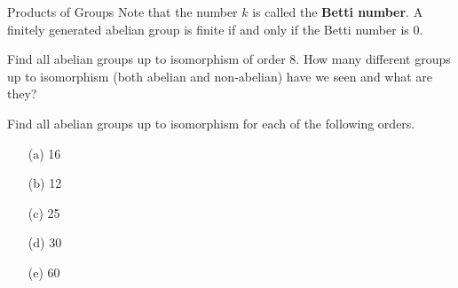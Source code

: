 \begin{section}{Products of Groups}
Note that the number $k$ is called the \textbf{Betti number}.  A  finitely generated abelian group is finite if and only if the Betti number is 0.

\begin{exercise}
Find all abelian groups up to isomorphism of order 8.  How many different groups up to isomorphism (both abelian and non-abelian) have we seen and what are they?
\end{exercise}

\begin{exercise}
Find all abelian groups up to isomorphism for each of the following orders.
\begin{enumerate}
\item[(a)] 16
\item[(b)] 12
\item[(c)] 25
\item[(d)] 30
\item[(e)] 60
\end{enumerate}
\end{exercise}

\end{section}

